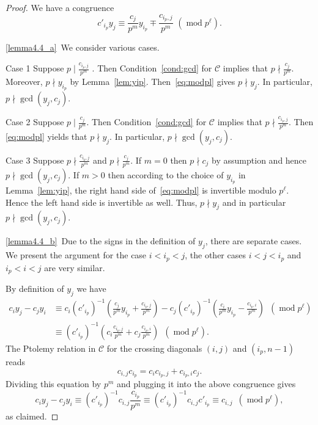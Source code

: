 \documentclass[10pt]{amsart}
\numberwithin{equation}{section}
\theoremstyle{definition}
\theoremstyle{remark}
\newenvironment{enonce*}[2][plain]{\par\noindent\textbf{#2.}\def\currentstyle{#1}\def\remarkstyle{remark}\ifx\currentstyle\remarkstyle\normalfont\else\itshape\fi}{\par}
\DeclareMathOperator{\md}{mod}
\begin{document}
\begin{proof}
We have a congruence 
\begin{equation} \label{eq:modpl}
 c'_{i_p} y_j \equiv \frac{c_j}{p^m} y_{i_p} \mp \frac{c_{i_p,j}}{p^m}\,\,
(\md p^{\ell}).
\end{equation}

\ref{lemma4.4_a}~We consider various cases. 

\begin{enonce*}[remark]{Case 1} Suppose $p\mid \frac{c_{i_p,j}}{p^m}$ .
Then Condition~\eqref{cond:gcd} for $\mathcal{C}$ implies that 
$p\nmid \frac{c_{j}}{p^m}$. Moreover, $p\nmid y_{i_p}$ by Lemma~\ref{lem:yip}.
Then~\eqref{eq:modpl} gives $p\nmid y_j$. In particular, $p\nmid \gcd(y_j,c_j)$.
\end{enonce*}

\begin{enonce*}[remark]{Case 2} Suppose $p\mid \frac{c_{j}}{p^m}$. 
Then Condition~\eqref{cond:gcd} for $\mathcal{C}$ implies that 
$p\nmid \frac{c_{i_p,j}}{p^m}$. Then 
\eqref{eq:modpl} yields
that $p\nmid y_j$. In particular, $p\nmid \gcd(y_j,c_j)$. 
\end{enonce*}

\begin{enonce*}[remark]{Case 3} Suppose $p\nmid \frac{c_{i_p,j}}{p^m}$ and $p\nmid \frac{c_{j}}{p^m}$.
If $m=0$ then $p\nmid c_j$ by assumption and hence
$p\nmid \gcd(y_j,c_j)$. If $m>0$ then
according to the choice of $y_{i_p}$ in 
Lemma~\ref{lem:yip}, the right hand side of~\eqref{eq:modpl} is 
invertible modulo $p^{\ell}$. Hence the left hand side is invertible as well.
Thus, $p\nmid y_j$ and in particular $p\nmid \gcd(y_j,c_j)$. 
\end{enonce*}


\ref{lemma4.4_b}~Due to the signs in the definition of $y_j$, 
there are separate cases. We present the argument for the case $i<i_p<j$, the other cases
$i<j<i_p$ and $i_p<i<j$ are very similar. 

By definition of $y_j$ we have
\begin{align*}
c_i y_j - c_j y_i & \equiv  c_i (c'_{i_p})^{-1} \left(\frac{c_j}{p^m} y_{i_p} + \frac{c_{i_p,j}}{p^m}\right)
- c_j (c'_{i_p})^{-1}\left( \frac{c_i}{p^m} y_{i_p} - \frac{c_{i_p,i}}{p^m}\right)\,\,\,
(\md p^{\ell}) \\
 & \equiv  (c'_{i_p})^{-1} \left( c_i \frac{c_{i_p,j}}{p^m} + c_j \frac{c_{i_p,i}}{p^m}\right)
 \,\,\,(\md p^{\ell}) .
\end{align*}
The Ptolemy relation in $\mathcal{C}$ for the crossing diagonals $(i,j)$ and $(i_p,n-1)$
reads 
\[
c_{i,j} c_{i_p} = c_i c_{i_p,j} + c_{i_p,i}c_j.
\]
Dividing this equation by $p^m$ and plugging it into the above congruence gives
\[
c_i y_j - c_j y_i \equiv (c'_{i_p})^{-1} c_{i,j} \frac{c_{i_p}}{p^m}
\equiv (c'_{i_p})^{-1} c_{i,j} c'_{i_p}
\equiv c_{i,j}\,\,\,(\md p^{\ell}),
\]
as claimed.
\end{proof}
\end{document}
